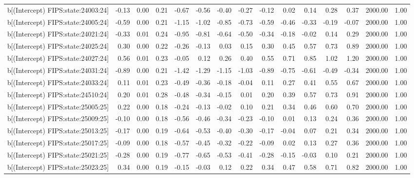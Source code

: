 \begin{table}[ht]
\begin{tabular}{rrrrrrrrrrrrrrr}
  b[(Intercept) FIPS:state:24003:24] & -0.13 & 0.00 & 0.21 & -0.67 & -0.56 & -0.40 & -0.27 & -0.12 & 0.02 & 0.14 & 0.28 & 0.37 & 2000.00 & 1.00 \\ 
  b[(Intercept) FIPS:state:24005:24] & -0.59 & 0.00 & 0.21 & -1.15 & -1.02 & -0.85 & -0.73 & -0.59 & -0.46 & -0.33 & -0.19 & -0.07 & 2000.00 & 1.00 \\ 
  b[(Intercept) FIPS:state:24021:24] & -0.33 & 0.01 & 0.24 & -0.95 & -0.81 & -0.64 & -0.50 & -0.34 & -0.18 & -0.02 & 0.14 & 0.29 & 2000.00 & 1.00 \\ 
  b[(Intercept) FIPS:state:24025:24] & 0.30 & 0.00 & 0.22 & -0.26 & -0.13 & 0.03 & 0.15 & 0.30 & 0.45 & 0.57 & 0.73 & 0.89 & 2000.00 & 1.00 \\ 
  b[(Intercept) FIPS:state:24027:24] & 0.56 & 0.01 & 0.23 & -0.05 & 0.12 & 0.26 & 0.40 & 0.55 & 0.71 & 0.85 & 1.02 & 1.20 & 2000.00 & 1.00 \\ 
  b[(Intercept) FIPS:state:24031:24] & -0.89 & 0.00 & 0.21 & -1.42 & -1.29 & -1.15 & -1.03 & -0.89 & -0.75 & -0.61 & -0.49 & -0.34 & 2000.00 & 1.00 \\ 
  b[(Intercept) FIPS:state:24033:24] & 0.11 & 0.01 & 0.23 & -0.49 & -0.36 & -0.18 & -0.04 & 0.11 & 0.27 & 0.41 & 0.55 & 0.67 & 2000.00 & 1.00 \\ 
  b[(Intercept) FIPS:state:24510:24] & 0.20 & 0.01 & 0.28 & -0.48 & -0.34 & -0.15 & 0.01 & 0.20 & 0.39 & 0.57 & 0.73 & 0.91 & 2000.00 & 1.00 \\ 
  b[(Intercept) FIPS:state:25005:25] & 0.22 & 0.00 & 0.18 & -0.24 & -0.13 & -0.02 & 0.10 & 0.21 & 0.34 & 0.46 & 0.60 & 0.70 & 2000.00 & 1.00 \\ 
  b[(Intercept) FIPS:state:25009:25] & -0.10 & 0.00 & 0.18 & -0.56 & -0.46 & -0.34 & -0.23 & -0.10 & 0.01 & 0.13 & 0.24 & 0.36 & 2000.00 & 1.00 \\ 
  b[(Intercept) FIPS:state:25013:25] & -0.17 & 0.00 & 0.19 & -0.64 & -0.53 & -0.40 & -0.30 & -0.17 & -0.04 & 0.07 & 0.21 & 0.34 & 2000.00 & 1.00 \\ 
  b[(Intercept) FIPS:state:25017:25] & -0.09 & 0.00 & 0.18 & -0.57 & -0.45 & -0.32 & -0.22 & -0.09 & 0.02 & 0.13 & 0.27 & 0.36 & 2000.00 & 1.00 \\ 
  b[(Intercept) FIPS:state:25021:25] & -0.28 & 0.00 & 0.19 & -0.77 & -0.65 & -0.53 & -0.41 & -0.28 & -0.15 & -0.03 & 0.10 & 0.21 & 2000.00 & 1.00 \\ 
  b[(Intercept) FIPS:state:25023:25] & 0.34 & 0.00 & 0.19 & -0.15 & -0.03 & 0.12 & 0.22 & 0.34 & 0.47 & 0.58 & 0.71 & 0.82 & 2000.00 & 1.00 \\ 

\end{tabular}
\end{table}
